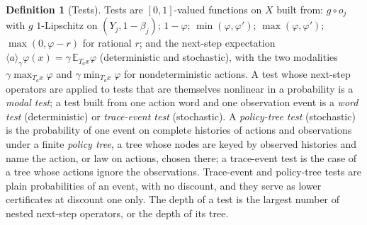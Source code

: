 \documentclass[11pt]{article}
\theoremstyle{definition}
\newtheorem{definition}{Definition}[section]
\theoremstyle{plain}
\begin{document}
\begin{definition}[Tests]\label{def:tests}
Tests are $[0,1]$-valued functions on $X$ built from: $g\circ o_j$ with $g$ $1$-Lipschitz on
$(Y_j,1-\beta_j)$; $1-\varphi$; $\min(\varphi,\varphi')$; $\max(\varphi,\varphi')$;
$\max(0,\varphi-r)$ for rational $r$; and the next-step expectation
$\langle a\rangle_\gamma\varphi(x)=\gamma\,\mathbb E_{T_ax}\varphi$ (deterministic and
stochastic), with the two modalities $\gamma\max_{T_ax}\varphi$ and $\gamma\min_{T_ax}\varphi$
for nondeterministic actions. A test whose next-step operators are applied to tests that are
themselves nonlinear in a probability is a \emph{modal test}; a test built from one action word
and one observation event is a \emph{word test} (deterministic) or \emph{trace-event test}
(stochastic). A \emph{policy-tree test} (stochastic) is the probability of one event on complete
histories of actions and observations under a finite \emph{policy tree}, a tree whose nodes are
keyed by observed histories and name the action, or law on actions, chosen there; a trace-event test
is the case of a tree whose actions ignore the observations. Trace-event and policy-tree tests are
plain probabilities of an event, with no discount, and they serve as lower certificates at discount
one only. The depth of a test is the largest number of nested next-step operators, or the depth of
its tree.
\end{definition}
\end{document}
